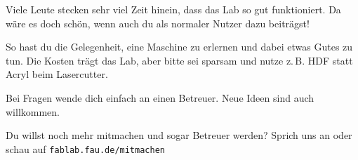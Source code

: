 \documentclass[a4paper]{scrartcl}
\begin{document}
\Schild[0.85]

Viele Leute stecken sehr viel Zeit hinein, dass das Lab so gut funktioniert. Da wäre es doch
schön, wenn auch du als normaler Nutzer dazu beiträgst!


So hast du die Gelegenheit, eine Maschine zu erlernen und dabei etwas Gutes zu tun.
Die Kosten trägt das Lab, aber bitte sei sparsam und nutze z.\,B. HDF statt Acryl beim
Lasercutter.

Bei Fragen wende dich einfach an einen Betreuer. Neue Ideen sind auch willkommen.

Du willst noch mehr mitmachen und sogar Betreuer werden? Sprich uns an oder schau auf
\texttt{fablab.fau.de/mitmachen}
\end{document}
